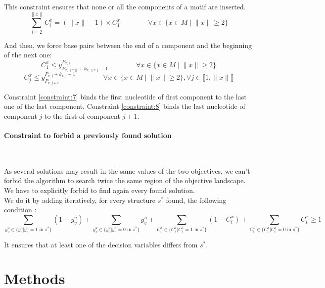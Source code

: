 \documentclass{article}
\begin{document}
This constraint ensures that none or all the components of a motif are inserted.
\begin{equation}\label{constraint:6}
	\sum_{i=2}^{\|x\|} C^x_i = (\|x\| - 1) \times C^{x}_{1}	 \qquad \qquad \forall x \in \{ x\in M \; | \; \|x\| \geq 2\}
\end{equation}

And then, we force base pairs between the end of a component and the beginning of the next one:
\begin{equation}\label{constraint:7}
	C^x_1 \leq y^{P_{x,1}}_{P_{x,\|x\|}+k_{x,\|x\|}-1} \qquad \qquad \forall x \in \{ x\in M \; | \; \|x\| \geq 2\}
\end{equation}
\begin{equation}\label{constraint:8}
	C^x_j \leq y^{P_{x,j}+k_{x,j}-1}_{P_{x,j+1}} \qquad \qquad \forall x \in \{ x\in M \; | \; \|x\| \geq 2\}, \forall j \in \llbracket 1,\|x\| \llbracket
\end{equation}

Constraint \ref{constraint:7} binds the first nucleotide of first component to the last one of the last component. 
Constraint \ref{constraint:8} binds the last nucleotide of component $j$ to the first of component $j+1$.

\paragraph{Constraint to forbid a previously found solution} ~ 

As several solutions may result in the same values of the two objectives, we can't forbid the algorithm to search twice the same region of the objective landscape.
We have to explicitly forbid to find again every found solution.\\
We do it by adding iteratively, for every structure $s^*$ found, the following condition :
\begin{equation}\label{constraint:9}
	\sum_{y^u_v \in \{ y^u_v  | y^u_v = 1 \text{ in } s^* \}} (1 - y^u_v) + \sum_{y^u_v \in \{ y^u_v  | y^u_v = 0 \text{ in } s^* \}} y^u_v +
	\sum_{C^x_i \in \{ C^x_i  | C^x_i = 1 \text{ in } s^* \}} (1 - C^x_i) + \sum_{C^x_i \in \{ C^x_i  |C^x_i = 0 \text{ in } s^* \}} C^x_i \geq 1
\end{equation}

It ensures that at least one of the decision variables differs from $s^*$.

\section{Methods \label{methods}}
\end{document}
